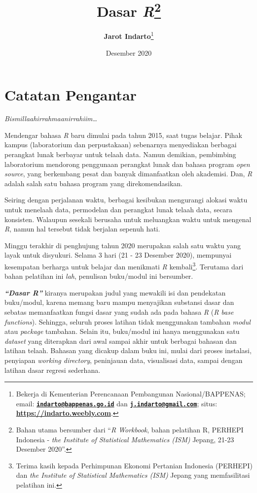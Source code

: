 \documentclass[
  12pt,
  a4paper,
]{scrbook}
\title{\textbf{Dasar \emph{R}}\footnote{Bahan utama bersumber dari ``\emph{R
  Workbook}, bahan pelatihan R, PERHEPI Indonesia - \emph{the Institute
  of Statistical Mathematics (ISM)} Jepang, 21-23 Desember 2020''.}}
\author{\textbf{Jarot Indarto}\footnote{Bekerja di Kementerian Perencanaan
  Pembangunan Nasional/BAPPENAS; email:
  \textbf{\href{mailto:indarto@bappenas.go.id}{\nolinkurl{indarto@bappenas.go.id}}}
  dan
  \textbf{\href{mailto:j.indarto@gmail.com}{\nolinkurl{j.indarto@gmail.com}}};
  situs: \textbf{\url{https://indarto.weebly.com}}.}}
\date{Desember 2020}
\begin{document}
\frontmatter
\maketitle

\renewcommand*\contentsname{Daftar Isi}
{
\hypersetup{linkcolor=}
\setcounter{tocdepth}{2}
\tableofcontents
}
\mainmatter
\newpage

\hypertarget{catatan-pengantar}{%
\chapter*{Catatan Pengantar}\label{catatan-pengantar}}

\emph{Bismillaahirrahmaanirrahiim\ldots{}}

Mendengar bahasa \emph{R} baru dimulai pada tahun 2015, saat tugas
belajar. Pihak kampus (laboratorium dan perpustakaan) sebenarnya
menyediakan berbagai perangkat lunak berbayar untuk telaah data. Namun
demikian, pembimbing laboratorium mendorong penggunaan perangkat lunak
dan bahasa program \emph{open source}, yang berkembang pesat dan banyak
dimanfaatkan oleh akademisi. Dan, \emph{R} adalah salah satu bahasa
program yang direkomendasikan.

Seiring dengan perjalanan waktu, berbagai kesibukan mengurangi alokasi
waktu untuk menelaah data, permodelan dan perangkat lunak telaah data,
secara konsisten. Walaupun sesekali berusaha untuk meluangkan waktu
untuk mengenal \emph{R}, namun hal tersebut tidak berjalan sepenuh hati.

Minggu terakhir di penghujung tahun 2020 merupakan salah satu waktu yang
layak untuk disyukuri. Selama 3 hari (21 - 23 Desember 2020), mempunyai
kesempatan berharga untuk belajar dan menikmati \emph{R}
kembali\footnote{Terima kasih kepada Perhimpunan Ekonomi Pertanian
  Indonesia (PERHEPI) dan \emph{the Institute of Statistical Mathematics
  (ISM)} Jepang yang memfasilitasi pelatihan ini.}. Terutama dari bahan
pelatihan ini \emph{lah}, penulisan buku/modul ini bersumber.

\textbf{\emph{``Dasar R''}} kiranya merupakan judul yang mewakili isi
dan pendekatan buku/modul, karena memang baru mampu menyajikan substansi
dasar dan sebatas memanfaatkan fungsi dasar yang sudah ada pada bahasa
\emph{R} (\emph{R base functions}). Sehingga, seluruh proses latihan
tidak menggunakan tambahan \emph{modul} atau \emph{package} tambahan.
Selain itu, buku/modul ini hanya menggunakan satu \emph{dataset} yang
diterapkan dari awal sampai akhir untuk berbagai bahasan dan latihan
telaah. Bahasan yang dicakup dalam buku ini, mulai dari proses
instalasi, penyiapan \emph{working directory}, peninjauan data,
visualisasi data, sampai dengan latihan dasar regresi sederhana.
\end{document}
